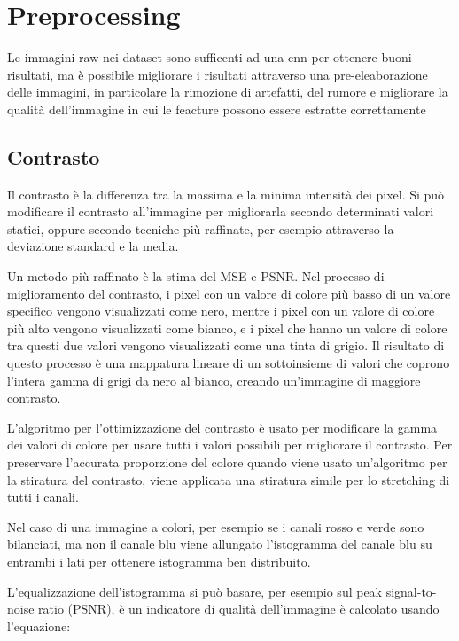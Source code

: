 \chapter{Preprocessing}\label{preprocessing}

Le immagini raw nei dataset sono sufficenti ad una \gls{cnn} per ottenere buoni risultati, ma è possibile migliorare i risultati attraverso una pre-eleaborazione delle immagini, in particolare la rimozione di artefatti,  del rumore e migliorare la qualità dell'immagine 
in cui le feacture  possono essere estratte correttamente\cite{permual_contrast}

\section{Contrasto}\label{contrasto}

Il contrasto è la differenza tra la massima e la minima
intensità dei pixel. Si può modificare il contrasto all'immagine per migliorarla secondo determinati valori statici, oppure secondo tecniche più raffinate, per esempio attraverso la deviazione standard e la media. 

Un metodo più raffinato è la stima del MSE e PSNR. Nel processo di miglioramento del contrasto, i pixel con
un valore di colore più basso di un valore specifico vengono visualizzati come
nero, mentre i pixel con un valore di colore più alto vengono
visualizzati come bianco, e i pixel che hanno un valore di colore tra questi due valori vengono visualizzati come una tinta di grigio.
Il risultato di questo processo è una mappatura lineare di un
sottoinsieme di valori che coprono l'intera gamma di grigi da
nero al bianco, creando un'immagine di maggiore contrasto. 

L'algoritmo per l'ottimizzazione del contrasto è usato per modificare
la gamma dei valori di colore per usare tutti i valori possibili per
migliorare il contrasto. Per preservare l'accurata proporzione del colore
quando viene usato un'algoritmo per la  stiratura del contrasto,
viene applicata una stiratura simile per lo stretching di tutti i canali. 

Nel caso di una immagine a colori, per esempio se i canali rosso e verde sono bilanciati, ma non il canale blu viene allungato l'istogramma del canale blu su entrambi i lati per ottenere
istogramma ben distribuito.

L'equalizzazione dell'istogramma si può basare, per esempio sul peak signal-to-noise ratio (PSNR), è un indicatore di qualità dell'immagine è calcolato usando l'equazione:

